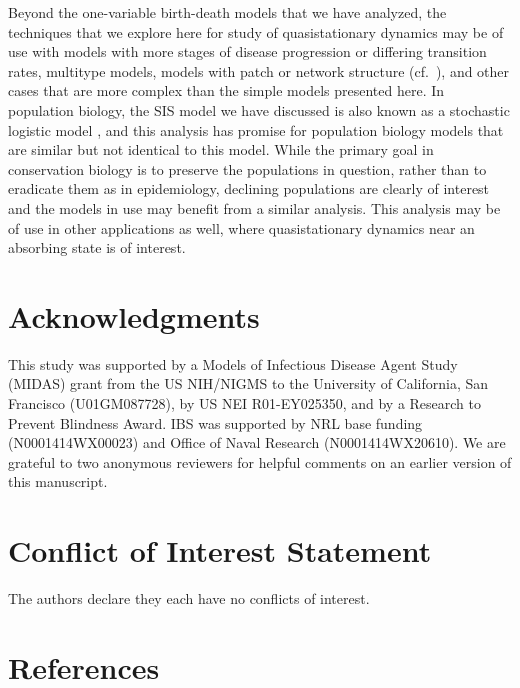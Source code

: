 \documentclass[review]{elsarticle}
\begin{document}
Beyond the one-variable birth-death models that we have analyzed,
the techniques that we explore here for study of quasistationary dynamics
may be of use with 
models with more stages of disease progression or differing transition rates,
multitype models,
models with patch or network structure (cf.\ \cite{hindes_epidemic2016}),
and other cases that are more complex than the simple models presented here.
In population biology, the SIS model we have discussed is also known
as a stochastic logistic model \cite{nasell1999},
and this analysis has promise for population
biology models that are similar but not identical to this
model.
While the primary goal in conservation biology is to preserve the
populations in question,
rather than to eradicate them as in epidemiology, declining populations
are clearly of interest and the models in use
may benefit from a similar analysis.
This analysis may be of use in other applications as well,
where quasistationary dynamics near an absorbing state
is of interest.

\section{Acknowledgments}

This study was supported by a Models of Infectious Disease
Agent Study (MIDAS) grant from the US NIH/NIGMS to the
University of California, San Francisco (U01GM087728),
by US NEI R01-EY025350,
and by a Research to Prevent Blindness Award.
IBS was supported by NRL base funding (N0001414WX00023)
and Office of Naval Research (N0001414WX20610).
We are grateful to two anonymous reviewers for helpful
comments on an earlier version of this manuscript.

\section{Conflict of Interest Statement}

The authors declare they each have no conflicts of interest.


\section{References}




\end{document}
